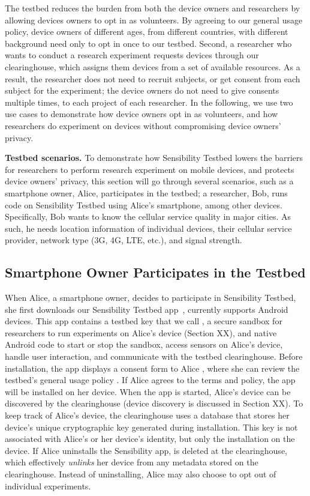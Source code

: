 The testbed reduces the burden from both the device owners and
researchers by allowing devices owners to opt in as volunteers.
By agreeing to our general usage policy, device owners of
different ages, from different countries, with different
background need only to opt in once to our testbed. Second, a
researcher who wants to conduct a research experiment requests
devices through our clearinghouse, which assigns them devices
from a set of available resources. As a result, the researcher
does not need to recruit subjects, or get consent from each
subject for the experiment; the device owners do not need to
give consents multiple times, to each project of each
researcher. In the following, we use two use cases to
demonstrate how device owners opt in as volunteers, and how
researchers do experiment on devices without compromising device
owners' privacy.

\textbf{Testbed scenarios.}
To demonstrate how Sensibility Testbed lowers the barriers for
researchers to perform research experiment on mobile devices,
and protects device owners' privacy, this section will go
through several scenarios, such as a smartphone owner, Alice,
participates in the testbed; a researcher, Bob, runs code on
Sensibility Testbed using Alice's smartphone, among other
devices. Specifically, Bob wants to know the cellular service
quality in major cities. As such, he needs location information
of individual devices, their cellular service provider, network
type (3G, 4G, LTE, etc.), and signal strength.

\subsection{Smartphone Owner Participates in the Testbed}
\label{sec-owner-participate}

When Alice, a smartphone owner, decides to participate in
Sensibility Testbed, she first downloads our Sensibility Testbed
app~\cite{sensibility-app}, currently supports Android devices.
This app contains a testbed key that we call
, a secure sandbox for researchers to run
experiments on Alice's device (Section XX), and native Android
code to start or stop the sandbox, access sensors on Alice's
device, handle user interaction, and communicate with the
testbed clearinghouse. Before installation, the app displays a
consent form to Alice , where she can review
the testbed's general usage policy . If Alice
agrees to the terms and policy, the app will be installed on her
device. When the app is started, Alice's device can be
discovered by the clearinghouse (device discovery is discussed
in Section XX). To keep track of Alice's device, the
clearinghouse uses a database that stores her device's unique
cryptographic key  generated during
installation. This key is not associated with Alice's or her
device's identity, but only the installation on the device. If
Alice uninstalls the Sensibility app,  is
deleted at the clearinghouse, which effectively \textit{unlinks}
her device from any metadata stored on the clearinghouse.
Instead of uninstalling, Alice may also choose to opt out of
individual experiments.

